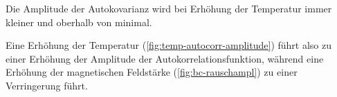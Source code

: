 \documentclass[main.tex]{subfiles}
\begin{document}
Die Amplitude der Autokovarianz wird bei Erhöhung der Temperatur immer kleiner und oberhalb von  minimal.

Eine Erhöhung der Temperatur (\cref{fig:temp-autocorr-amplitude}) führt also zu einer Erhöhung der Amplitude der Autokorrelationsfunktion, während eine Erhöhung der magnetischen Feldstärke (\cref{fig:bc-rauschampl}) zu einer Verringerung führt.

\end{document}
